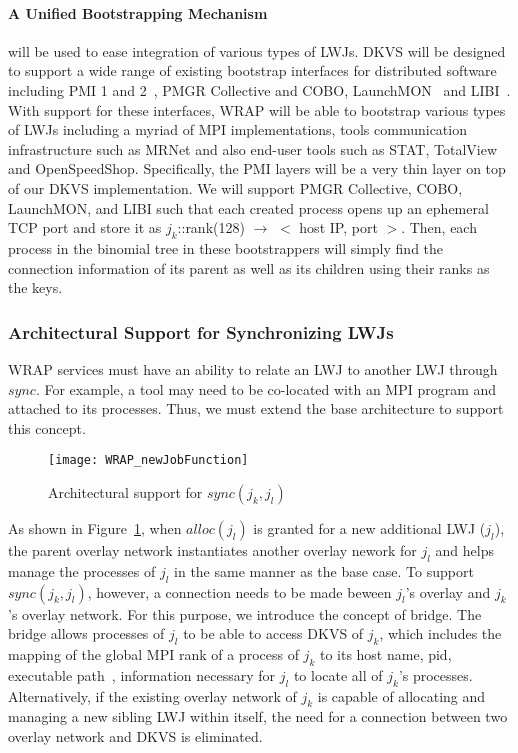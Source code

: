 \paragraph{A Unified Bootstrapping Mechanism }
\label{sect:bootstrap}
will be used to ease integration of various types of LWJs.
DKVS will be designed to support a wide range of existing bootstrap interfaces
for distributed software including PMI 1 and 2~\cite{PMI2}, PMGR Collective and COBO,
LaunchMON~\cite{launchmon} and LIBI~\cite{libi}. With support for these interfaces,
WRAP will be able to bootstrap various types of LWJs including a myriad of
MPI implementations, tools communication infrastructure such as MRNet
and also end-user tools such as STAT, TotalView and OpenSpeedShop.
Specifically, the PMI layers will be a very thin layer on top
of our DKVS implementation. We will support PMGR Collective,
COBO, LaunchMON, and LIBI such that each created process opens
up an ephemeral TCP port and store it as $j_k$::rank(128) $\rightarrow$ $<$ host IP, port $>$.
Then, each process in the binomial tree in these bootstrappers
will simply find the connection information of its parent as well as
its children using their ranks as the keys.

\subsubsection{Architectural Support for Synchronizing LWJs}
\label{sect:sync}
WRAP services must have an ability to relate an LWJ to another LWJ through $sync$.
For example, a tool may need to be co-located with an MPI program
and attached to its processes.
Thus, we must extend the base architecture to support this concept.
\begin{figure}
  \centering
    \texttt{[image: WRAP\_newJobFunction]}
  \caption{Architectural support for ${sync(j_k, j_l)}$}
  \label{syncext}
\end{figure}
As shown in Figure~\ref{syncext}, when $alloc(j_l)$
is granted for a new additional LWJ ($j_l$),
the parent overlay network instantiates
another overlay nework for $j_l$ and helps manage
the processes of $j_l$ in the same manner as the base case.
To support ${sync(j_k, j_l)}$,
however, a connection needs to be made beween $j_l$'s
overlay and $j_k$'s overlay network.
For this purpose, we introduce the concept
of bridge. The bridge allows processes
of $j_l$ to be able to access DKVS of $j_k$, which includes
the mapping of the global MPI rank of a process of $j_k$
to its host name, pid, executable path~\cite{MPIRInterface},
information necessary for $j_l$ to locate all of $j_k$'s processes.
Alternatively, if the existing overlay network of $j_k$ is
capable of allocating and managing a new sibling LWJ
within itself, the need for a connection between two overlay
network and DKVS is eliminated.

